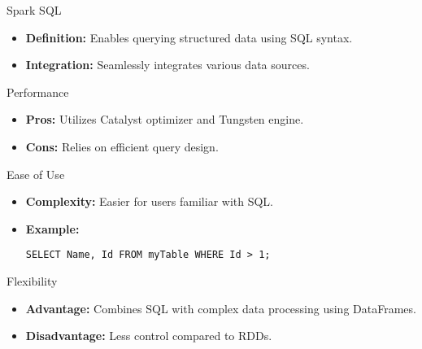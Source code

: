 \documentclass[aspectratio=169]{beamer}
\begin{document}
\begin{frame}[fragile]
    \begin{block}{Spark SQL}
        \begin{itemize}
            \item \textbf{Definition:} Enables querying structured data using SQL syntax.
            \item \textbf{Integration:} Seamlessly integrates various data sources.
        \end{itemize}

        \begin{block}{Performance}
            \begin{itemize}
                \item \textbf{Pros:} Utilizes Catalyst optimizer and Tungsten engine.
                \item \textbf{Cons:} Relies on efficient query design.
            \end{itemize}
        \end{block}

        \begin{block}{Ease of Use}
            \begin{itemize}
                \item \textbf{Complexity:} Easier for users familiar with SQL.
                \item \textbf{Example:}
                \begin{lstlisting}
SELECT Name, Id FROM myTable WHERE Id > 1;
                \end{lstlisting}
            \end{itemize}
        \end{block}

        \begin{block}{Flexibility}
            \begin{itemize}
                \item \textbf{Advantage:} Combines SQL with complex data processing using DataFrames.
                \item \textbf{Disadvantage:} Less control compared to RDDs.
            \end{itemize}
        \end{block}
    \end{block}
\end{frame}
\end{document}
